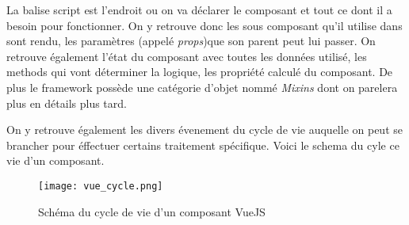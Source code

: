 La balise script est l'endroit ou on va déclarer le composant et tout ce dont il a besoin pour fonctionner. On y retrouve donc les sous composant qu'il utilise dans sont rendu, les paramètres (appelé \textit{props})que son parent peut lui passer. On retrouve également l'état du composant avec toutes les données utilisé, les methods qui vont déterminer la logique, les propriété calculé du composant.
De plus le framework possède une catégorie d'objet nommé \textit{Mixins} dont on parelera plus en détails plus tard.

On y retrouve également les divers évenement du cycle de vie auquelle on  peut se brancher pour éffectuer certains traitement spécifique. Voici le schema du cyle ce vie d'un composant.  

\begin{figure}[htbp]
    \center
    \texttt{[image: vue\_cycle.png]}
    \caption{Schéma du cycle de vie d'un composant VueJS}
\end{figure}

